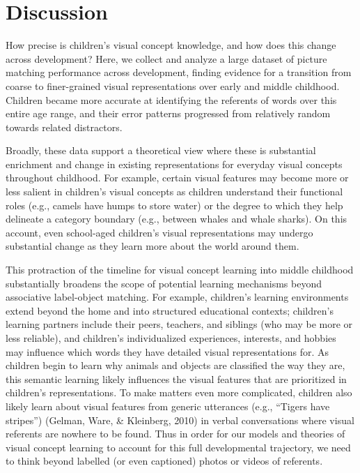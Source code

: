 \documentclass[
  man,mask]{apa6}
\begin{document}
\section{Discussion}\label{discussion}

How precise is children's visual concept knowledge, and how does this change across development? Here, we collect and analyze a large dataset of picture matching performance across development, finding evidence for a transition from coarse to finer-grained visual representations over early and middle childhood. Children became more accurate at identifying the referents of words over this entire age range, and their error patterns progressed from relatively random towards related distractors.

Broadly, these data support a theoretical view where these is substantial enrichment and change in existing representations for everyday visual concepts throughout childhood. For example, certain visual features may become more or less salient in children's visual concepts as children understand their functional roles (e.g., camels have humps to store water) or the degree to which they help delineate a category boundary (e.g., between whales and whale sharks). On this account, even school-aged children's visual representations may undergo substantial change as they learn more about the world around them.

This protraction of the timeline for visual concept learning into middle childhood substantially broadens the scope of potential learning mechanisms beyond associative label-object matching. For example, children's learning environments extend beyond the home and into structured educational contexts; children's learning partners include their peers, teachers, and siblings (who may be more or less reliable), and children's individualized experiences, interests, and hobbies may influence which words they have detailed visual representations for. As children begin to learn why animals and objects are classified the way they are, this semantic learning likely influences the visual features that are prioritized in children's representations. To make matters even more complicated, children also likely learn about visual features from generic utterances (e.g., ``Tigers have stripes'') (Gelman, Ware, \& Kleinberg, 2010) in verbal conversations where visual referents are nowhere to be found. Thus in order for our models and theories of visual concept learning to account for this full developmental trajectory, we need to think beyond labelled (or even captioned) photos or videos of referents.
\end{document}
